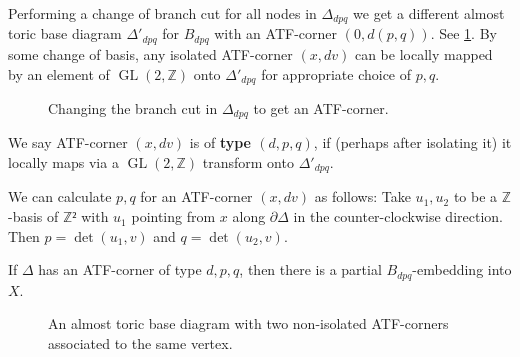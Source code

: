 \documentclass[12pt,a4paper,draft]{scrartcl}
\DeclareMathOperator{\GL}{GL}
\begin{document}
Performing a change of branch cut for all nodes in $Δ_{dpq}$ we get a different almost toric base diagram $Δ'_{dpq}$ for $B_{dpq}$ with an ATF-corner $(0,d(p,q))$. See \cref{fig:Bdpq_moment_image_alt}.
By some change of basis, any isolated ATF-corner $(x,dv)$ can be locally mapped by an element of $\GL(2,ℤ)$ onto $Δ'_{dpq}$ for appropriate choice of $p,q$.

\begin{figure}
\centering
{}   
\caption{Changing the branch cut in $Δ_{dpq}$ to get an ATF-corner.}
\label{fig:Bdpq_moment_image_alt}
\end{figure}

\begin{definition}
  \label{def:atf_corner_type}
  We say ATF-corner $(x,dv)$ is of \textbf{type $(d,p,q)$}, if (perhaps after isolating it) it locally maps via a $\GL(2,ℤ)$ transform onto $Δ'_{dpq}$.
\end{definition}

We can calculate $p,q$ for an ATF-corner $(x,dv)$ as follows: Take $u_1,u_2$ to be a $ℤ$-basis of $ℤ²$ with $u_1$ pointing from $x$ along $∂Δ$ in the counter-clockwise direction. Then $p=\det(u_1,v)$ and $q = \det(u_2,v)$.

\begin{lemma}
  \label{thm:atf_bdpq}
  If $Δ$ has an ATF-corner of type $d,p,q$, then there is a partial $B_{dpq}$-embedding into $X$.
\end{lemma}

\begin{figure}
  \centering
  \caption{An almost toric base diagram with two non-isolated ATF-corners associated to the same vertex.}
  \label{fig:atf_example2}
\end{figure}
\end{document}
